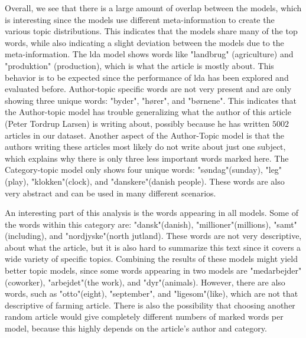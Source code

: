 {}

Overall, we see that there is a large amount of overlap between the models, which is interesting since the models use different meta-information to create the various topic distributions.
This indicates that the models share many of the top words, while also indicating a slight deviation between the models due to the meta-information.
The \gls{lda} model shows words like "landbrug" (agriculture) and "produktion" (production), which is what the article is mostly about.
This behavior is to be expected since the performance of \gls{lda} has been explored and evaluated before. 
Author-topic specific words are not very present and are only showing three unique words: "byder", "hører", and "børnene".
This indicates that the Author-topic model has trouble generalizing what the author of this article (Peter Tordrup Larsen) is writing about, possibly because he has written $5002$ articles in our dataset.
Another aspect of the Author-Topic model is that the authors writing these articles most likely do not write about just one subject, which explains why there is only three less important words marked here. 
The Category-topic model only shows four unique words: "søndag"(sunday), "leg"(play), "klokken"(clock), and "danskere"(danish people).
These words are also very abstract and can be used in many different scenarios.

An interesting part of this analysis is the words appearing in all models.
Some of the words within this category are: "dansk"(danish), "millioner"(millions), "samt"(including), and "nordjyske"(north jutland).
These words are not very descriptive, about what the article, but it is also hard to summarize this text since it covers a wide variety of specific topics.
Combining the results of these models might yield better topic models, since some words appearing in two models are "medarbejder"(coworker), "arbejdet"(the work), and "dyr"(animals).
However, there are also words, such as "otto"(eight), "september", and "ligesom"(like), which are not that descriptive of farming article. 
There is also the possibility that choosing another random article would give completely different numbers of marked words per model, because this highly depends on the article's author and category.



